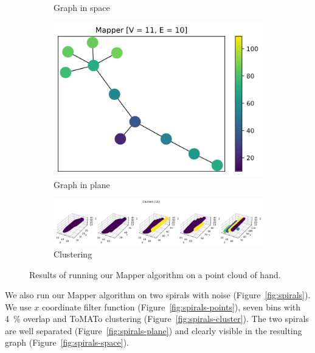 \documentclass{article}
\begin{document}
\begin{figure}[ht]
\begin{subfigure}[c]{0.3\columnwidth}
        \caption{Graph in space}
        \label{fig:hand-space}
    \end{subfigure}
    \begin{subfigure}[c]{0.3\columnwidth}
        \centering
        \includegraphics[width=\textwidth]{hand-graph-2d}
        \caption{Graph in plane}
        \label{fig:hand-plane}
    \end{subfigure}
    \begin{subfigure}[c]{0.9\columnwidth}
        \centering
        \includegraphics[width=\textwidth]{hand-clusters}
        \caption{Clustering}
        \label{fig:hand-cluster}
    \end{subfigure}
    \caption{Results of running our Mapper algorithm on a point cloud of hand.}
    \label{fig:hand}
\end{figure}

We also run our Mapper algorithm on two spirals with noise (Figure~\ref{fig:spirals}).
We use $x$ coordinate filter function (Figure~\ref{fig:spirals-points}), seven bins with 4~\% overlap and ToMATo clustering (Figure~\ref{fig:spirals-cluster}).
The two spirals are well separated (Figure~\ref{fig:spirals-plane}) and clearly visible in the resulting graph (Figure~\ref{fig:spirals-space}).
\end{document}
